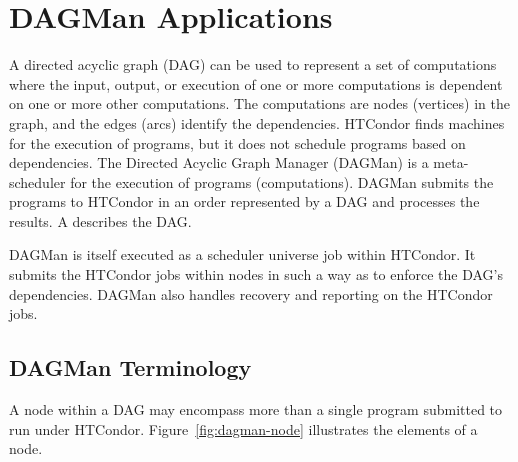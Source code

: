 \section{\label{sec:DAGMan}DAGMan Applications}

A directed acyclic graph (DAG) can be used to represent a set of computations
where the input, output, or execution of one or more computations
is dependent on one or more other computations.
The computations are nodes (vertices) in the graph,
and the edges (arcs) identify the dependencies.
HTCondor finds machines for the execution of programs, but it
does not schedule programs based on dependencies.
The Directed Acyclic Graph Manager (DAGMan) is a meta-scheduler for 
the execution of programs (computations). 
DAGMan submits the programs to HTCondor in an order represented by
a DAG and processes the results.
A  describes the DAG.

DAGMan is itself executed as a scheduler universe job
within HTCondor.
It submits the HTCondor jobs within nodes in such a way as to
enforce the DAG's dependencies.
DAGMan also handles recovery and reporting
on the HTCondor jobs.

\subsection{\label{sec:DAGTerminology}DAGMan Terminology}

A node within a DAG may encompass more than a single
program submitted to run under HTCondor.
Figure~\ref{fig:dagman-node} illustrates the elements of a node.

